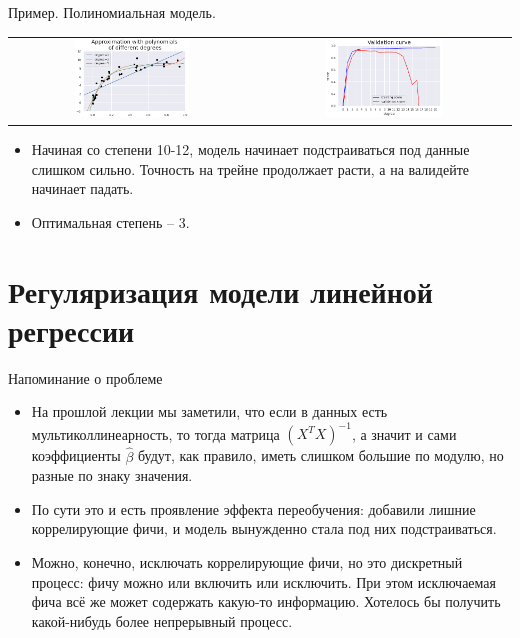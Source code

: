 \documentclass[9pt]{beamer}
\begin{document}
\begin{frame}{Пример. Полиномиальная модель.}
\begin{center}
    \begin{tabular}{cc}
    \includegraphics[width=0.49\textwidth]{2020 - 2021/lectures/source/img/overfitting_polynimial_1.png}
         &
    \includegraphics[width=0.49\textwidth]{2020 - 2021/lectures/source/img/overfitting_polynimial_2.png}
    \end{tabular}    
\end{center}
\begin{itemize}
    \item Начиная со степени 10-12, модель начинает подстраиваться под данные слишком сильно. Точность на трейне продолжает расти, а на валидейте начинает падать.
    \item Оптимальная степень -- 3.
\end{itemize}
\end{frame}

\section{Регуляризация модели линейной регрессии}

\begin{frame}{Напоминание о проблеме}
    \begin{itemize}
        \item На прошлой лекции мы заметили, что если в данных есть мультиколлинеарность, то тогда матрица $(X^TX)^{-1}$, а значит и сами коэффициенты $\hat \beta$ будут, как правило, иметь слишком большие по модулю, но разные по знаку значения.
        \item По сути это и есть проявление эффекта переобучения: добавили лишние коррелирующие фичи, и модель вынужденно стала под них подстраиваться.
        \item Можно, конечно, исключать коррелирующие фичи, но это дискретный процесс: фичу можно или включить или исключить. При этом исключаемая фича всё же может содержать какую-то информацию. Хотелось бы получить какой-нибудь более непрерывный процесс.
    \end{itemize}
\end{frame}
\end{document}
